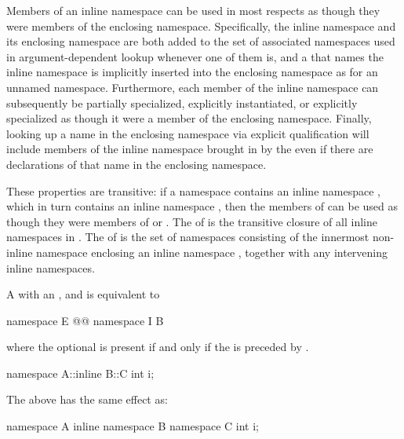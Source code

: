 \pnum
Members of an inline namespace can be used in most respects as though they were members
of the enclosing namespace. Specifically, the inline namespace and its enclosing
namespace are both added to the set of associated namespaces used in
argument-dependent lookup whenever one of them is,
and a  that names the inline
namespace is implicitly inserted into the enclosing namespace as for an unnamed
namespace. Furthermore, each
member of the inline namespace can subsequently be partially
specialized, explicitly
instantiated, or explicitly specialized as
though it were a member of the enclosing namespace. Finally, looking up a name in the
enclosing namespace via explicit qualification will include
members of the inline namespace brought in by the  even if
there are declarations of that name in the enclosing namespace.

\pnum
These properties are transitive: if a namespace  contains an inline namespace
, which in turn contains an inline namespace , then the members of
 can be used as though they were members of  or .
The  of  is the transitive closure of all
inline namespaces in .
The  of  is the set of namespaces
consisting of the innermost non-inline namespace enclosing
an inline namespace , together with any intervening inline namespaces.

\pnum
A  with an
 ,
  and
 
is equivalent to
\begin{codeblock}
namespace E { @@ namespace I { B } }
\end{codeblock}
where the optional  is present if and only if
the   is preceded by .
\begin{example}
\begin{codeblock}
namespace A::inline B::C {
  int i;
}
\end{codeblock}
The above has the same effect as:
\begin{codeblock}
namespace A {
  inline namespace B {
    namespace C {
      int i;
    }
  }
}
\end{codeblock}
\end{example}

